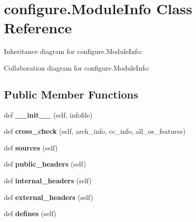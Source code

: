 \hypertarget{classconfigure_1_1_module_info}{}\section{configure.\+Module\+Info Class Reference}
\label{classconfigure_1_1_module_info}


Inheritance diagram for configure.\+Module\+Info\+:


Collaboration diagram for configure.\+Module\+Info\+:
\subsection*{Public Member Functions}
\begin{DoxyCompactItemize}
\item 
\mbox{\label{classconfigure_1_1_module_info_a4f050e5a39bb7e18211dcd8b09c274fb}} 
def {\bfseries \+\_\+\+\_\+init\+\_\+\+\_\+} (self, infofile)
\item 
\mbox{\label{classconfigure_1_1_module_info_af609a1c1d468aec82ac9ac05967f517b}} 
def {\bfseries cross\+\_\+check} (self, arch\+\_\+info, cc\+\_\+info, all\+\_\+os\+\_\+features)
\item 
\mbox{\label{classconfigure_1_1_module_info_a342c001d56630a3a1d34ce205e27895a}} 
def {\bfseries sources} (self)
\item 
\mbox{\label{classconfigure_1_1_module_info_a1ff5fe8888c320df52bf33f1de2b42b0}} 
def {\bfseries public\+\_\+headers} (self)
\item 
\mbox{\label{classconfigure_1_1_module_info_a9d221c182c3f662b7f15072a023b275c}} 
def {\bfseries internal\+\_\+headers} (self)
\item 
\mbox{\label{classconfigure_1_1_module_info_a1cee982da75cc3defccdd0744bbd517c}} 
def {\bfseries external\+\_\+headers} (self)
\item 
\mbox{\label{classconfigure_1_1_module_info_aa8e46e567e9cb1d334d2c82554146739}} 
def {\bfseries defines} (self)

\end{DoxyCompactItemize}
